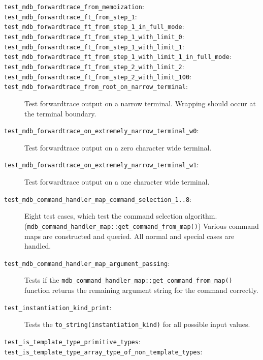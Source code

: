 \begin{description}
    \item[\texttt{test\_mdb\_forwardtrace\_from\_memoization}:]
    \item[\texttt{test\_mdb\_forwardtrace\_ft\_from\_step\_1}:]
    \item[\texttt{test\_mdb\_forwardtrace\_ft\_from\_step\_1\_in\_full\_mode}:]
    \item[\texttt{test\_mdb\_forwardtrace\_ft\_from\_step\_1\_with\_limit\_0}:]
    \item[\texttt{test\_mdb\_forwardtrace\_ft\_from\_step\_1\_with\_limit\_1}:]
    \item[\texttt{test\_mdb\_forwardtrace\_ft\_from\_step\_1\_with\_limit\_1\_in\_full\_mode}:]
    \item[\texttt{test\_mdb\_forwardtrace\_ft\_from\_step\_2\_with\_limit\_2}:]
    \item[\texttt{test\_mdb\_forwardtrace\_ft\_from\_step\_2\_with\_limit\_100}:]
    \item[\texttt{test\_mdb\_forwardtrace\_from\_root\_on\_narrow\_terminal}:]
        Test forwardtrace output on a narrow terminal. Wrapping should occur
        at the terminal boundary.
    \item[\texttt{test\_mdb\_forwardtrace\_on\_extremely\_narrow\_terminal\_w0}:]
        Test forwardtrace output on a zero character wide terminal.
    \item[\texttt{test\_mdb\_forwardtrace\_on\_extremely\_narrow\_terminal\_w1}:]
        Test forwardtrace output on a one character wide terminal.
    \item[\texttt{test\_mdb\_command\_handler\_map\_command\_selection\_1..8}:]
        Eight test cases, which test the command selection algorithm.
        (\texttt{mdb\_command\_handler\_map::get\_command\_from\_map()})
        Various command maps are constructed and queried. All normal and
        special cases are handled.
    \item[\texttt{test\_mdb\_command\_handler\_map\_argument\_passing}:]
        Tests if the
        \texttt{mdb\_command\_handler\_map::get\_command\_from\_map()}
        function returns the remaining argument string for the command
        correctly.
    \item[\texttt{test\_instantiation\_kind\_print}:]
        Tests the \texttt{to\_string(instantiation\_kind)} for all possible
        input values.
    \item[\texttt{test\_is\_template\_type\_primitive\_types}:]
    \item[\texttt{test\_is\_template\_type\_array\_type\_of\_non\_template\_types}:]

\end{description}
